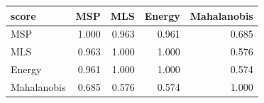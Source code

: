 \begin{tabular}{lrrrr}
\toprule
score & MSP & MLS & Energy & Mahalanobis \\
\midrule
MSP & 1.000 & 0.963 & 0.961 & 0.685 \\
MLS & 0.963 & 1.000 & 1.000 & 0.576 \\
Energy & 0.961 & 1.000 & 1.000 & 0.574 \\
Mahalanobis & 0.685 & 0.576 & 0.574 & 1.000 \\
\bottomrule
\end{tabular}
